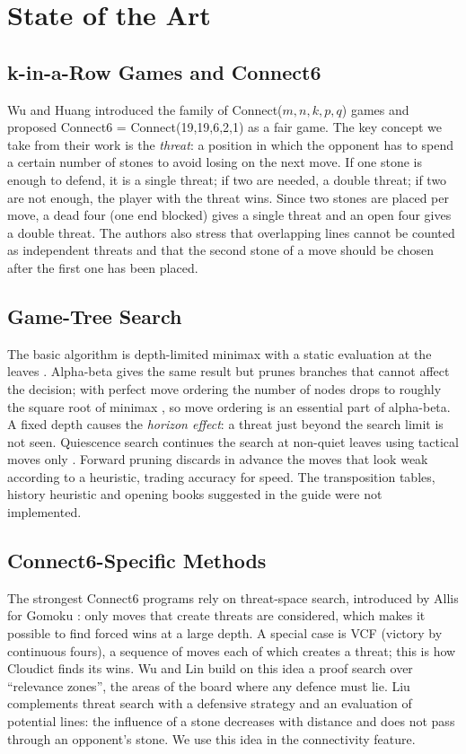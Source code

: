 \documentclass[a4paper,10pt,twocolumn]{article}
\begin{document}
\section{State of the Art}\label{sec:sota}

\subsection{k-in-a-Row Games and Connect6}
Wu and Huang \citeyearpar{wu2005family} introduced the family of Connect($m,n,k,p,q$) games and proposed Connect6 = Connect(19,19,6,2,1) as a fair game. The key concept we take from their work is the \emph{threat}: a position in which the opponent has to spend a certain number of stones to avoid losing on the next move. If one stone is enough to defend, it is a single threat; if two are needed, a double threat; if two are not enough, the player with the threat wins. Since two stones are placed per move, a dead four (one end blocked) gives a single threat and an open four gives a double threat. The authors also stress that overlapping lines cannot be counted as independent threats and that the second stone of a move should be chosen after the first one has been placed.

\subsection{Game-Tree Search}
The basic algorithm is depth-limited minimax with a static evaluation at the leaves \citep{russell2020aima}. Alpha-beta gives the same result but prunes branches that cannot affect the decision; with perfect move ordering the number of nodes drops to roughly the square root of minimax \citep{knuth1975alphabeta}, so move ordering is an essential part of alpha-beta. A fixed depth causes the \emph{horizon effect}: a threat just beyond the search limit is not seen. Quiescence search continues the search at non-quiet leaves using tactical moves only \citep{russell2020aima}. Forward pruning discards in advance the moves that look weak according to a heuristic, trading accuracy for speed. The transposition tables, history heuristic and opening books suggested in the guide \citep{statement} were not implemented.

\subsection{Connect6-Specific Methods}
The strongest Connect6 programs rely on threat-space search, introduced by Allis for Gomoku \citep{allis1994}: only moves that create threats are considered, which makes it possible to find forced wins at a large depth. A special case is VCF (victory by continuous fours), a sequence of moves each of which creates a threat; this is how Cloudict finds its wins. Wu and Lin \citeyearpar{wu2010rzop} build on this idea a proof search over ``relevance zones'', the areas of the board where any defence must lie. Liu \citeyearpar{liu_defensive} complements threat search with a defensive strategy and an evaluation of potential lines: the influence of a stone decreases with distance and does not pass through an opponent's stone. We use this idea in the connectivity feature.
\end{document}
